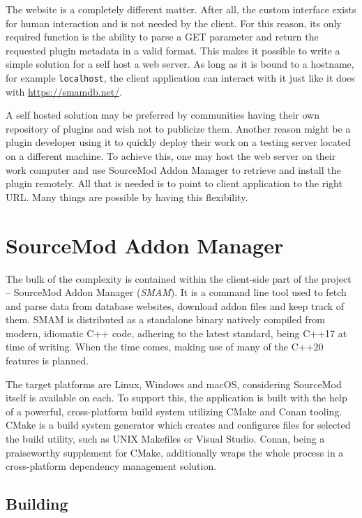The website is a completely different matter.
After all, the custom interface exists for human interaction and is not needed by the client.
For this reason, its only required function is the ability to parse a GET parameter and return the requested plugin metadata in a valid format.
This makes it possible to write a simple solution for a self host a web server.
As long as it is bound to a hostname, for example \verb|localhost|, the client application can interact with it just like it does with \url{https://smamdb.net/}.

A self hosted solution may be preferred by communities having their own repository of plugins and wish not to publicize them.
Another reason might be a plugin developer using it to quickly deploy their work on a testing server located on a different machine.
To achieve this, one may host the web server on their work computer and use SourceMod Addon Manager to retrieve and install the plugin remotely.
All that is needed is to point to client application to the right URL\@.
Many things are possible by having this flexibility.

\section{SourceMod Addon Manager}

The bulk of the complexity is contained within the client-side part of the project -- SourceMod Addon Manager (\textit{SMAM}).
It is a command line tool used to fetch and parse data from database websites, download addon files and keep track of them.
SMAM is distributed as a standalone binary natively compiled from modern, idiomatic C++ code, adhering to the latest standard, being C++17 at time of writing.
When the time comes, making use of many of the C++20 features is planned.

The target platforms are Linux, Windows and macOS, considering SourceMod itself is available on each.
To support this, the application is built with the help of a powerful, cross-platform build system utilizing CMake and Conan tooling.
CMake is a build system generator which creates and configures files for selected the build utility, such as UNIX Makefiles or Visual Studio.
Conan, being a praiseworthy supplement for CMake, additionally wraps the whole process in a cross-platform dependency management solution.

\subsection{Building}

